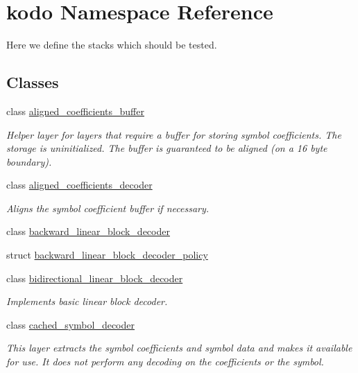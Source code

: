 \hypertarget{namespacekodo}{\section{kodo Namespace Reference}
\label{namespacekodo}
}


Here we define the stacks which should be tested.  


\subsection*{Classes}
\begin{DoxyCompactItemize}
\item 
class \hyperlink{classkodo_1_1aligned__coefficients__buffer}{aligned\-\_\-coefficients\-\_\-buffer}
\begin{DoxyCompactList}\small\item\em Helper layer for layers that require a buffer for storing symbol coefficients. The storage is uninitialized. The buffer is guaranteed to be aligned (on a 16 byte boundary). \end{DoxyCompactList}\item 
class \hyperlink{classkodo_1_1aligned__coefficients__decoder}{aligned\-\_\-coefficients\-\_\-decoder}
\begin{DoxyCompactList}\small\item\em Aligns the symbol coefficient buffer if necessary. \end{DoxyCompactList}\item 
class \hyperlink{classkodo_1_1backward__linear__block__decoder}{backward\-\_\-linear\-\_\-block\-\_\-decoder}
\item 
struct \hyperlink{structkodo_1_1backward__linear__block__decoder__policy}{backward\-\_\-linear\-\_\-block\-\_\-decoder\-\_\-policy}
\item 
class \hyperlink{classkodo_1_1bidirectional__linear__block__decoder}{bidirectional\-\_\-linear\-\_\-block\-\_\-decoder}
\begin{DoxyCompactList}\small\item\em Implements basic linear block decoder. \end{DoxyCompactList}\item 
class \hyperlink{classkodo_1_1cached__symbol__decoder}{cached\-\_\-symbol\-\_\-decoder}
\begin{DoxyCompactList}\small\item\em This layer extracts the symbol coefficients and symbol data and makes it available for use. It does not perform any decoding on the coefficients or the symbol. \end{DoxyCompactList}\item 

\end{DoxyCompactItemize}
